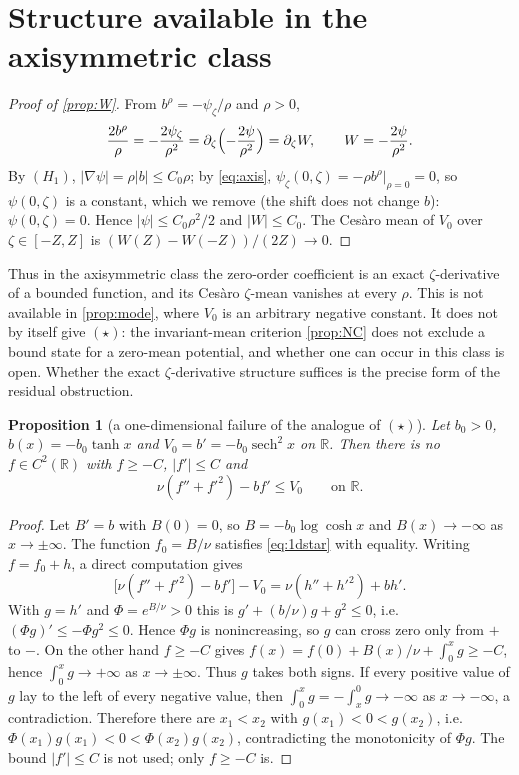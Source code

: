 \documentclass[11pt]{article}
\newtheorem{proposition}[theorem]{Proposition}
\theoremstyle{definition}
\newcommand{\R}{\mathbb{R}}
\begin{document}
\section{Structure available in the axisymmetric class}

\begin{proof}[Proof of \cref{prop:W}]
From $b^\rho=-\psi_\zeta/\rho$ and $\rho>0$,
\begin{equation}
\frac{2b^\rho}{\rho}=-\frac{2\psi_\zeta}{\rho^2}
=\partial_\zeta\Bigl(-\frac{2\psi}{\rho^2}\Bigr)=\partial_\zeta W,
\qquad W=-\frac{2\psi}{\rho^2}.
\end{equation}
By $(H_1)$, $|\nabla\psi|=\rho|b|\le C_0\rho$; by \eqref{eq:axis},
$\psi_\zeta(0,\zeta)=-\rho b^\rho|_{\rho=0}=0$, so $\psi(0,\zeta)$ is a
constant, which we remove (the shift does not change $b$): $\psi(0,\zeta)=0$.
Hence $|\psi|\le C_0\rho^2/2$ and $|W|\le C_0$. The
Ces\`aro mean of $V_0$ over $\zeta\in[-Z,Z]$ is
$(W(Z)-W(-Z))/(2Z)\to0$.
\end{proof}

Thus in the axisymmetric class the zero-order coefficient is an exact
$\zeta$-derivative of a bounded function, and its Ces\`aro $\zeta$-mean
vanishes at every $\rho$. This is not available in \cref{prop:mode}, where $V_0$ is an
arbitrary negative constant. It does not by itself give $(\star)$: the
invariant-mean criterion \cref{prop:NC} does not exclude a bound state for a
zero-mean potential, and whether one can occur in this class is open.
Whether the exact $\zeta$-derivative structure suffices is the precise form of
the residual obstruction.

\begin{proposition}[a one-dimensional failure of the analogue of $(\star)$]
\label{prop:1d}
Let $b_0>0$, $b(x)=-b_0\tanh x$ and $V_0=b'=-b_0\operatorname{sech}^2x$ on
$\R$. Then there is no $f\in C^2(\R)$ with $f\ge-C$, $|f'|\le C$ and
\begin{equation}\label{eq:1dstar}
\nu(f''+f'^2)-bf'\le V_0\qquad\text{on }\R .
\end{equation}
\end{proposition}
\begin{proof}
Let $B'=b$ with $B(0)=0$, so $B=-b_0\log\cosh x$ and
$B(x)\to-\infty$ as $x\to\pm\infty$. The function $f_0=B/\nu$ satisfies
\eqref{eq:1dstar} with equality. Writing $f=f_0+h$, a direct computation gives
\begin{equation}
\bigl[\nu(f''+f'^2)-bf'\bigr]-V_0=\nu(h''+h'^2)+bh'.
\end{equation}
With $g=h'$ and $\Phi=e^{B/\nu}>0$ this is
$g'+(b/\nu)g+g^2\le0$, i.e.\ $(\Phi g)'\le-\Phi g^2\le0$. Hence $\Phi g$ is
nonincreasing, so $g$ can cross zero only from $+$ to $-$.
On the other hand $f\ge-C$ gives
$f(x)=f(0)+B(x)/\nu+\int_0^xg\ge-C$, hence
$\int_0^xg\to+\infty$ as $x\to\pm\infty$. Thus $g$ takes both signs. If every
positive value of $g$ lay to the left of every negative value, then
$\int_0^xg=-\int_x^0g\to-\infty$ as $x\to-\infty$, a contradiction. Therefore
there are $x_1<x_2$ with $g(x_1)<0<g(x_2)$, i.e.\
$\Phi(x_1)g(x_1)<0<\Phi(x_2)g(x_2)$, contradicting the monotonicity of $\Phi g$.
The bound $|f'|\le C$ is not used; only $f\ge-C$ is.
\end{proof}
\end{document}
